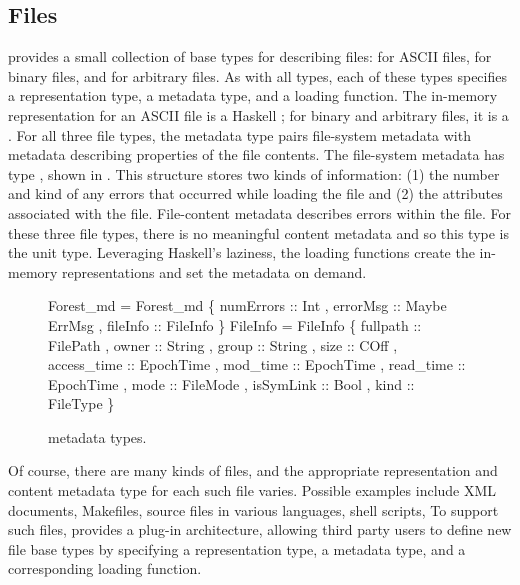 \subsection{Files}
\label{sec:basics}
\forest{} provides a small collection of base types for describing
files:  for ASCII files,  for binary files, and
 for arbitrary files.  As with all \forest{} types, each of
these types specifies a representation type, a metadata type, and a
loading function.  The in-memory representation for an ASCII file is a
Haskell ; for binary and arbitrary files, it is a
.  For all three file types, the metadata type pairs
file-system metadata with metadata describing properties of the file
contents.  The file-system metadata has type , shown in
.  This structure stores two kinds of
information: (1) the number and kind of any errors that occurred while
loading the file and (2) the attributes associated with the file.
%
File-content metadata describes errors within the file.
For these three file types, there is
no meaningful content metadata and so this type is the unit type.
Leveraging Haskell's laziness, the loading functions create the
in-memory representations and set the metadata on demand.

\begin{figure}
\begin{centercode}
 Forest_md = Forest_md 
   \{ numErrors :: Int
   , errorMsg  :: Maybe ErrMsg
   , fileInfo  :: FileInfo \}
\mbox{}
 FileInfo = FileInfo 
   \{ fullpath    :: FilePath
   , owner       :: String
   , group       :: String
   , size        :: COff
   , access_time :: EpochTime
   , mod_time    :: EpochTime
   , read_time   :: EpochTime
   , mode        :: FileMode
   , isSymLink   :: Bool
   , kind        :: FileType \}
\end{centercode}
\caption{\forest{} metadata types.}
\label{fig:forest-md}
\end{figure}

Of course, there are many kinds of files, and the appropriate
representation and content metadata type for each such file varies.
Possible examples include XML documents, Makefiles, source files in
various languages, shell scripts, \etc{}  To support such files,
\forest{} provides a plug-in architecture, allowing third party users
to define new file base types by specifying a representation type, a
metadata type, and a corresponding loading function.

